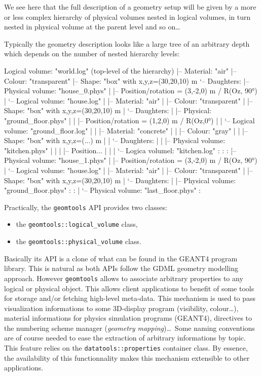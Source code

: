 We see  here that  the full  description of a  geometry setup  will be
given by a  more or less complex hierarchy  of physical volumes nested
in logical  volumes, in turn nested  in physical volume  at the parent
level and so on\dots

Typically the geometry description looks like a large tree
of an arbitrary depth which depends on the number of nested
hierarchy levels:
\begin{ShellVerbatim}
Logical volume: "world.log" (top-level of the hierarchy)
|-- Material: "air"
|-- Colour: "transparent"
|-- Shape: "box" with x,y,z=(30,20,10) m
`-- Daughters:
    |-- Physical volume: "house_0.phys"
    |    |-- Position/rotation = (3,-2,0) m / R(Oz, 90°)
    |    `-- Logical volume: "house.log"
    |        |-- Material: "air"
    |        |-- Colour: "transparent"
    |        |-- Shape: "box" with x,y,z=(30,20,10) m
    |        `-- Daughters:
    |            |-- Physical: "ground_floor.phys"
    |            |   |-- Position/rotation = (1,2,0) m / R(Oz,0°)
    |            |   `-- Logical volume: "ground_floor.log"
    |            |       |-- Material: "concrete"
    |            |       |-- Colour: "gray"
    |            |       |-- Shape: "box" with x,y,z=(...) m
    |            |       `-- Daughters:
    |            |           |-- Physical volume: "kitchen.phys"
    |            |           |    |-- Position...
    |            |           |    `-- Logica volumel: "kitchen.log"
    :            :           :
    |-- Physical volume: "house_1.phys"
    |    |-- Position/rotation = (3,-2,0) m / R(Oz, 90°)
    |    `-- Logical volume: "house.log"
    |        |-- Material: "air"
    |        |-- Colour: "transparent"
    |        |-- Shape: "box" with x,y,z=(30,20,10) m
    |        `-- Daughters:
    |            |-- Physical volume: "ground_floor.phys"
    :            :
    |            `-- Physical volume: "last_floor.phys"
    :
\end{ShellVerbatim}

\pn Practically, the \texttt{geomtools} API provides
two classes:
\begin{itemize}
\item the \texttt{geomtools::logical\_volume} class,
\item the \texttt{geomtools::physical\_volume} class.
\end{itemize}
\pn Basically its  API is a clone  of what can be found  in the GEANT4
program library. This is natural as both APIs follow the GDML geometry
modelling approach. However \texttt{geomtools} allows to associate arbitrary
properties to any logical or physical object. This allows
client applications to benefit of some tools for storage and/or fetching
high-level meta-data. This mechanism is used to pass visualization informations
to some 3D-display program (visibility, colour\dots), material informations
for physics simulation programs (GEANT4), directives to the numbering scheme
manager (\emph{geometry mapping})\dots\ Some naming conventions are of course needed
to ease the extraction of arbitrary informations by topic. This
feature relies on the \texttt{datatools::properties} container class.
By essence, the availability of this functionnality makes this mechanism
extensible to other applications.

